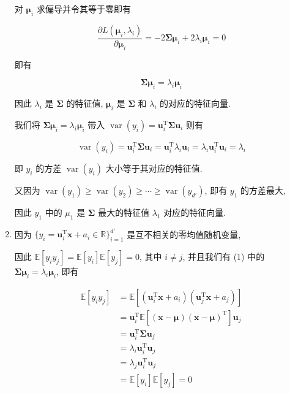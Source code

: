 \documentclass[answers]{exam}  %
\begin{document}
\begin{questions}
\begin{solution}
\begin{enumerate}
            对 $\bm{\mu}_i$ 求偏导并令其等于零即有

            $$
              \frac{\partial L(\bm{\mu}_i, \lambda_i)}{\partial \bm{\mu}_i} = -2\bm{\Sigma} \bm{\mu}_i + 2\lambda_i \bm{\mu}_i = 0
            $$

            即有

            $$
              \bm{\Sigma} \bm{\mu}_i = \lambda_i \bm{\mu}_i
            $$

            因此 $\lambda_i$ 是 $\bm{\Sigma}$ 的特征值, $\bm{\mu}_i$ 是 $\bm{\Sigma}$ 和 $\lambda_i$ 的对应的特征向量.

            我们将 $\bm{\Sigma} \bm{\mu}_i = \lambda_i \bm{\mu}_i$ 带入 $\operatorname{var}(y_i) = \bm{u}_i^{\mathrm{T}}\bm{\Sigma}\bm{u}_i$ 则有

            $$
              \operatorname{var}(y_i) = \bm{u}_i^{\mathrm{T}}\bm{\Sigma}\bm{u}_i = \bm{u}_i^{\mathrm{T}}\lambda_i\bm{u}_i = \lambda_i\bm{u}_i^{\mathrm{T}}\bm{u}_i = \lambda_i
            $$

            即 $y_i$ 的方差 $\operatorname{var}(y_i)$ 大小等于其对应的特征值.

            又因为 $\operatorname{var}(y_1) \ge \operatorname{var}(y_2) \ge \cdots \ge \operatorname{var}(y_{d'})$, 即有 $y_1$ 的方差最大,

            因此 $y_1$ 中的 $\mu_1$ 是 $\bm{\Sigma}$ 最大的特征值 $\lambda_1$ 对应的特征向量.

      \item

            因为 $\{ y_i = \bm{u}_i^{\mathrm{T}}\bm{x} + a_i \in \mathbb{R} \}_{i=1}^{d'}$ 是互不相关的零均值随机变量,

            因此 $\mathbb{E}[y_i y_j] = \mathbb{E}[y_i]\mathbb{E}[y_j] = 0$, 其中 $i \neq j$, 并且我们有 (1) 中的 $\bm{\Sigma} \bm{\mu}_i = \lambda_i \bm{\mu}_i$, 即有

            $$
              \begin{aligned}
                \mathbb{E}[y_i y_j]
                 & = \mathbb{E}[(\bm{u}_i^{\mathrm{T}}\bm{x} + a_i)(\bm{u}_j^{\mathrm{T}}\bm{x} + a_j)]           \\
                 & = \bm{u}_i^{\mathrm{T}}\mathbb{E}[(\bm{x} - \bm{\mu})(\bm{x} - \bm{\mu})^{\mathrm{T}}]\bm{u}_j \\
                 & = \bm{u}_i^{\mathrm{T}}\bm{\Sigma}\bm{u}_j                                                     \\
                 & = \lambda_i\bm{u}_i^{\mathrm{T}}\bm{u}_j                                                       \\
                 & = \lambda_j\bm{u}_i^{\mathrm{T}}\bm{u}_j                                                       \\
                 & = \mathbb{E}[y_i]\mathbb{E}[y_j]  = 0                                                          \\
              \end{aligned}
            $$


\end{enumerate}
\end{solution}
\end{questions}
\end{document}

